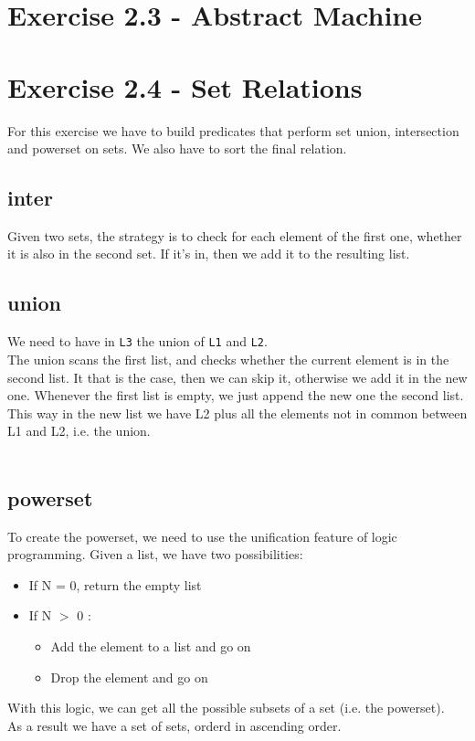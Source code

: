 \documentclass{article}
\begin{document}
\section{Exercise 2.3 - Abstract Machine}

\section{Exercise 2.4 - Set Relations}
For this exercise we have to build predicates that perform set union, intersection and powerset on sets. We also have to sort the final relation.
\subsection{inter}
Given two sets, the strategy is to check for each element of the first one, whether it is also in the second set. If it's in, then we add it to the resulting list.
\setcounter{lstlisting}{3}

\subsection{union}
We need to have in \texttt{L3} the union of \texttt{L1} and \texttt{L2}.\\
The union scans the first list, and checks whether the current element is in the second list. It that is the case, then we can skip it, otherwise we add it in the new one. Whenever the first list is empty, we just append the new one the second list. This way in the new list we have L2 plus all the elements not in common between L1 and L2, i.e. the union. \\ \\
\setcounter{lstlisting}{4}

\subsection{powerset}
To create the powerset, we need to use the unification feature of logic programming. Given a list, we have two possibilities:\\
\begin{itemize}
    \item If N = 0, return the empty list
    \item If N $>$ 0 :
    \begin{itemize}
        \item Add the element to a list and go on
        \item Drop the element and go on
    \end{itemize}
\end{itemize}
With this logic, we can get all the possible subsets of a set (i.e. the powerset).\\
As a result we have a set of sets, orderd in ascending order.
\setcounter{lstlisting}{5}

\end{document}
